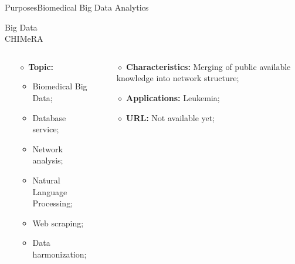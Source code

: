 \documentclass[10pt, technote, oribibl, unicode]{beamer}
\begin{document}
\begin{frame}{Purposes}{Biomedical Big Data Analytics}
  \begin{alertblock}{Big Data\\CHIMeRA}
    \begin{columns}
      \begin{column}{0.45\textwidth}
        \begin{itemize}
          \item[$\diamond$] \textbf{Topic:}
            \begin{itemize}
              \item Biomedical Big Data;
              \item Database service;
              \item Network analysis;
              \item Natural Language Processing;
              \item Web scraping;
              \item Data harmonization;
            \end{itemize}
          \end{itemize}
      \end{column}
      \begin{column}{0.55\textwidth}
        \begin{itemize}
          \item[$\diamond$] \textbf{Characteristics:} Merging of public available knowledge into network structure;
          \item[$\diamond$] \textbf{Applications:} Leukemia;
          \item[$\diamond$] \textbf{URL:} Not available yet;
        \end{itemize}
      \end{column}
    \end{columns}
  \end{alertblock}

\end{frame}






\end{document}
